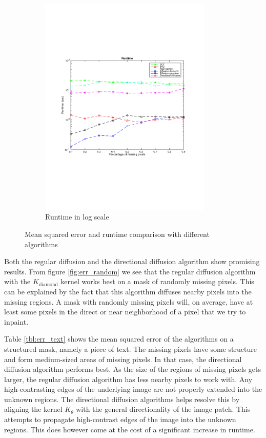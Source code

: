 \begin{figure}
\begin{subfigure}[b]{0.49\textwidth}
		\includegraphics[clip, trim=2cm 7cm 2cm 6cm, width=0.9\textwidth]{figures/runtime_vector}
		\caption{Runtime in log scale}
		\label{fig:runtime}
	\end{subfigure}
	
	\caption{Mean squared error and runtime comparison with different algorithms}
	\label{fig:results}
\end{figure}


Both the regular diffusion and the directional diffusion algorithm show promising results. From figure \ref{fig:err_random} we see that the regular diffusion algorithm with the $K_{\text{diamond}}$ kernel works best on a mask of randomly missing pixels. This can be explained by the fact that this algorithm diffuses nearby pixels into the missing regions. A mask with randomly missing pixels will, on average, have at least some pixels in the direct or near neighborhood of a pixel that we try to inpaint.


Table \ref{tbl:err_text} shows the mean squared error of the algorithms on a structured mask, namely a piece of text. The missing pixels have some structure and form medium-sized areas of missing pixels. In that case, the directional diffusion algorithm performs best. As the size of the regions of missing pixels gets larger, the regular diffusion algorithm has less nearby pixels to work with. Any high-contrasting edges of the underlying image are not properly extended into the unknown regions. The directional diffusion algorithms helps resolve this by aligning the kernel  $K_{\theta}$ with the general directionality of the image patch. This attempts to propagate high-contrast edges of the image into the unknown regions. This does however come at the cost of a significant increase in runtime.


